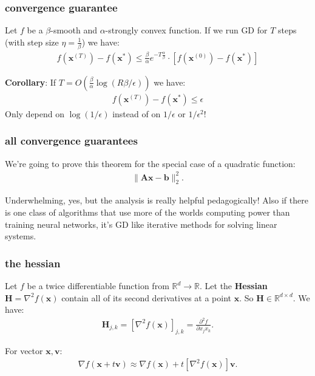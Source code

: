 \documentclass[compress]{beamer}
\newcommand{\bv}[1]{\mathbf{#1}}
\newcommand{\R}{\mathbb{R}}
\begin{document}
\begin{frame}[t]
	\frametitle{convergence guarantee}
	\begin{theorem}
		Let $f$ be a $\beta$-smooth and $\alpha$-strongly convex function. If we run GD for $T$ steps (with step size $\eta = \frac{1}{\beta}$) we have:
		\begin{align*}
			f(\bv{x}^{(T)}) - f(\bv{x}^*)  \leq \frac{\beta}{\alpha} e^{-T\frac{\alpha}{\beta}} \cdot  \left[f(\bv{x}^{(0)}) - f(\bv{x}^*)\right]
		\end{align*} 
	\end{theorem}	
%	
	
	\textbf{Corollary}: 
	If \alert{$T = O\left(\frac{\beta}{\alpha}\log(R\beta/\epsilon)\right)$} we have:
	\begin{align*}
		f({\bv{x}}^{(T)}) - f(\bv{x}^*) \leq \epsilon
	\end{align*}
	Only depend on $\log(1/\epsilon)$ instead of on $1/\epsilon$ or $1/\epsilon^2$!
\end{frame}

\begin{frame}[t]
	\frametitle{all convergence guarantees}
We're going to prove this theorem for the special case of a quadratic function:
\begin{align*}
	\|\bv{A}\bv{x}- \bv{b}\|_2^2.
\end{align*}

Underwhelming, yes, but the analysis is really helpful pedagogically! Also if there is one class of algorithms that use more of the worlds computing power than training neural networks, it's GD like iterative methods for solving linear systems.
\end{frame}

\begin{frame}[t]
	\frametitle{the hessian}
	Let $f$ be a twice differentiable function from $\R^d \rightarrow \R$. Let the \textbf{\alert{Hessian}} $\bv{H} = \nabla^2 f(\bv{x})$ contain all of its second derivatives at a point $\bv{x}$. So $\bv{H}\in \R^{d\times d}$.  We have:
	\begin{align*}
		\bv{H}_{j,k} = \left[\nabla^2 f(\bv{x})\right]_{j,k} = \frac{\partial^2 f}{\partial x_j x_k}. 
	\end{align*}
	
	For vector $\bv{x}, \bv{v}$:
	\begin{align*}
		\nabla f(\bv{x} + t\bv{v}) \approx \nabla f(\bv{x}) + t\left[\nabla^2 f(\bv{x})\right]\bv{v}.
	\end{align*}
\end{frame}
\end{document}
